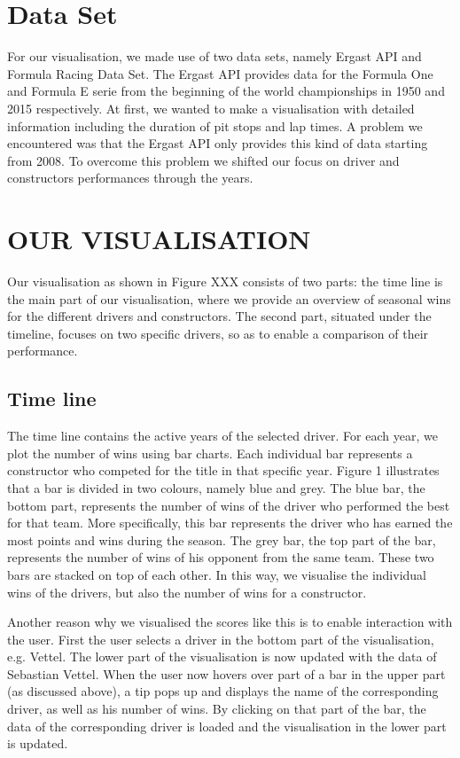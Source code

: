 \documentclass{sigchi}
\begin{document}
\section{Data Set}

For our visualisation, we made use of two data sets, namely Ergast API and Formula Racing Data Set. The Ergast API provides data for the Formula One and Formula E serie from the beginning of the world championships in 1950 and 2015 respectively. At first, we wanted to make a visualisation with detailed information including the duration of pit stops and lap times. A problem we encountered was that the Ergast API only provides this kind of data starting from 2008. To overcome this problem we shifted our focus on driver and constructors performances through the years.

\section{OUR VISUALISATION}
Our visualisation as shown in Figure XXX consists of two parts: the time line is the main part of our visualisation, where we provide an overview of seasonal wins for the different drivers and constructors. The second part, situated under the timeline, focuses on two specific drivers, so as to enable a comparison of their performance. 

\subsection{Time line}

The time line contains the active years of the selected driver. For each year, we plot the number of wins using bar charts. Each individual bar represents a constructor who competed for the title in that specific year. Figure 1 illustrates that a bar is divided in two colours, namely blue and grey. The blue bar, the bottom part, represents the number of wins of the driver who performed the best for that team. More specifically, this bar represents the driver who has earned the most points and wins  during the season. The grey bar, the top part of the bar, represents the number of wins of his opponent from the same team. These two bars are stacked on top of each other. In this way, we visualise the individual wins of the drivers, but also the number of wins for a constructor.

Another reason why we visualised the scores like this is to enable interaction with the user. First the user selects a driver in the bottom part of the visualisation, e.g. Vettel. The lower part of the visualisation is now updated with the data of Sebastian Vettel. When the user now hovers over part of a bar in the upper part (as discussed above), a tip pops up and displays the name of the corresponding driver, as well as his number of wins. By clicking on that part of the bar, the data of the corresponding driver is loaded and the visualisation in the lower part is updated. 
\end{document}
